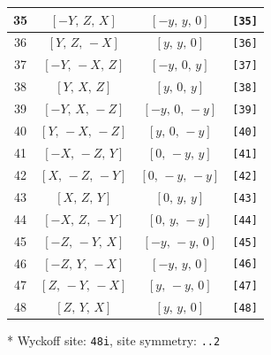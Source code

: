 \documentclass[fleqn,8pt]{jsarticle}
\begin{document}
\begin{longtable}{cccc}
35 & $\left[ - Y,\, Z,\, X \right]$ & $\left[ - y,\, y,\, 0 \right]$ & {\tt [35]} \\ \hline
36 & $\left[ Y,\, Z,\, - X \right]$ & $\left[ y,\, y,\, 0 \right]$ & {\tt [36]} \\ \hline
37 & $\left[ - Y,\, - X,\, Z \right]$ & $\left[ - y,\, 0,\, y \right]$ & {\tt [37]} \\ \hline
38 & $\left[ Y,\, X,\, Z \right]$ & $\left[ y,\, 0,\, y \right]$ & {\tt [38]} \\ \hline
39 & $\left[ - Y,\, X,\, - Z \right]$ & $\left[ - y,\, 0,\, - y \right]$ & {\tt [39]} \\ \hline
40 & $\left[ Y,\, - X,\, - Z \right]$ & $\left[ y,\, 0,\, - y \right]$ & {\tt [40]} \\ \hline
41 & $\left[ - X,\, - Z,\, Y \right]$ & $\left[ 0,\, - y,\, y \right]$ & {\tt [41]} \\ \hline
42 & $\left[ X,\, - Z,\, - Y \right]$ & $\left[ 0,\, - y,\, - y \right]$ & {\tt [42]} \\ \hline
43 & $\left[ X,\, Z,\, Y \right]$ & $\left[ 0,\, y,\, y \right]$ & {\tt [43]} \\ \hline
44 & $\left[ - X,\, Z,\, - Y \right]$ & $\left[ 0,\, y,\, - y \right]$ & {\tt [44]} \\ \hline
45 & $\left[ - Z,\, - Y,\, X \right]$ & $\left[ - y,\, - y,\, 0 \right]$ & {\tt [45]} \\ \hline
46 & $\left[ - Z,\, Y,\, - X \right]$ & $\left[ - y,\, y,\, 0 \right]$ & {\tt [46]} \\ \hline
47 & $\left[ Z,\, - Y,\, - X \right]$ & $\left[ y,\, - y,\, 0 \right]$ & {\tt [47]} \\ \hline
48 & $\left[ Z,\, Y,\, X \right]$ & $\left[ y,\, y,\, 0 \right]$ & {\tt [48]} \\
\end{longtable}
* Wyckoff site: {\tt 48i}, site symmetry: {\tt ..2}
\renewcommand{\arraystretch}{1.2}
\end{document}
